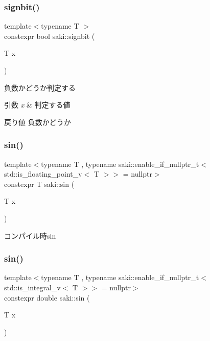\subsubsection{\texorpdfstring{signbit()}{signbit()}}
{\footnotesize\ttfamily template$<$typename T $>$ \\
constexpr bool saki\+::signbit (\begin{DoxyParamCaption}\item[{T}]{x }\end{DoxyParamCaption})}



負数かどうか判定する 


\begin{DoxyParams}{引数}
{\em x} & 判定する値 \\
\hline
\end{DoxyParams}
\begin{DoxyReturn}{戻り値}
負数かどうか 
\end{DoxyReturn}
\mbox{\label{namespacesaki_a743f7284cdebb6406db9b37e42bcd730}} 
\subsubsection{\texorpdfstring{sin()}{sin()}\hspace{0.1cm}{\footnotesize\ttfamily [1/2]}}
{\footnotesize\ttfamily template$<$typename T , typename saki\+::enable\+\_\+if\+\_\+nullptr\+\_\+t$<$ std\+::is\+\_\+floating\+\_\+point\+\_\+v$<$ T $>$$>$  = nullptr$>$ \\
constexpr T saki\+::sin (\begin{DoxyParamCaption}\item[{T}]{x }\end{DoxyParamCaption})}



コンパイル時sin 

\mbox{\label{namespacesaki_a9fd77d1e52189e28f4a5d069891501cf}} 
\subsubsection{\texorpdfstring{sin()}{sin()}\hspace{0.1cm}{\footnotesize\ttfamily [2/2]}}
{\footnotesize\ttfamily template$<$typename T , typename saki\+::enable\+\_\+if\+\_\+nullptr\+\_\+t$<$ std\+::is\+\_\+integral\+\_\+v$<$ T $>$$>$  = nullptr$>$ \\
constexpr double saki\+::sin (\begin{DoxyParamCaption}\item[{T}]{x }\end{DoxyParamCaption})}




